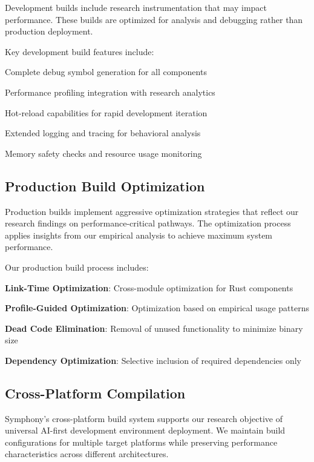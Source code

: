 \begin{alertbox}
Development builds include research instrumentation that may impact performance. These builds are optimized for analysis and debugging rather than production deployment.
\end{alertbox}

Key development build features include:
\begin{compactlist}
    \item Complete debug symbol generation for all components
    \item Performance profiling integration with research analytics
    \item Hot-reload capabilities for rapid development iteration
    \item Extended logging and tracing for behavioral analysis
    \item Memory safety checks and resource usage monitoring
\end{compactlist}

\subsection*{Production Build Optimization}

Production builds implement aggressive optimization strategies that reflect our research findings on performance-critical pathways. The optimization process applies insights from our empirical analysis to achieve maximum system performance.

Our production build process includes:
\begin{expandedlist}
    \item \textbf{Link-Time Optimization}: Cross-module optimization for Rust components
    \item \textbf{Profile-Guided Optimization}: Optimization based on empirical usage patterns
    \item \textbf{Dead Code Elimination}: Removal of unused functionality to minimize binary size
    \item \textbf{Dependency Optimization}: Selective inclusion of required dependencies only
\end{expandedlist}

\subsection*{Cross-Platform Compilation}

Symphony's cross-platform build system supports our research objective of universal AI-first development environment deployment. We maintain build configurations for multiple target platforms while preserving performance characteristics across different architectures.

